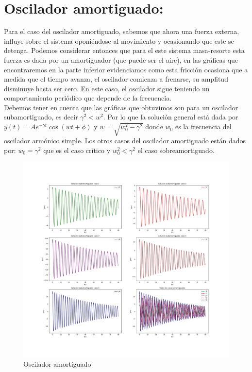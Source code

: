\documentclass{article}
\begin{document}
\section{Oscilador amortiguado:}
Para el caso del oscilador amortiguado, sabemos que ahora una fuerza externa, influye sobre el sistema oponiéndose al movimiento y ocasionando que este se detenga. Podemos considerar entonces que para el este sistema masa-resorte esta fuerza es dada por un amortiguador (que puede ser el aire), en las gráficas que encontraremos en la parte inferior evidenciamos como esta fricción ocasiona que a medida que el tiempo avanza, el oscilador comienza a frenarse, su amplitud disminuye hasta ser cero. En este caso, el oscilador sigue teniendo un comportamiento periódico que depende de la frecuencia. \\

Debemos tener en cuenta que las gráficas que obtuvimos son para un oscilador subamortiguado, es decir $\gamma ^2<w^2$. Por lo que la solución general está dada por $y(t)=Ae^{-\gamma t}\cos(wt+\phi)$ y $w=\sqrt{w_{0}^2-\gamma^2}$ donde $w_{0}$ es la frecuencia del oscilador armónico simple. Los otros casos del oscilador amortiguado están dados por: $w_{0}=\gamma^2$ que es el caso crítico y $w_{0}^2<\gamma^2$ el caso sobreamortiguado.

\begin{figure}[htp]
    \centering
    \includegraphics[width=17cm]{Osciladoramortiguado.jpg}
    \caption{Oscilador amortiguado}
    \label{fig:oscilador2}
\end{figure}
\\ \\
\end{document}
